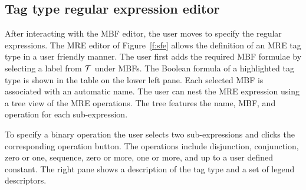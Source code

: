 \vspace{-1em}
\subsection{Tag type regular expression editor}

After interacting with the MBF editor, the user moves to 
specify the regular expressions. 
The MRE editor of Figure~\ref{f:sfe} allows the 
definition of an MRE tag type in a user friendly manner. 
The user first adds the required MBF formulae 
by selecting a label from ${\cal T}$ under MBFs. 
The Boolean formula of a highlighted tag type is shown in the table on the lower left pane. 
Each selected MBF is associated with an automatic name. 
The user can nest the MRE expression using a tree view of the MRE operations. 
The tree features the name, MBF, and operation for each sub-expression. 


To specify a binary operation the user selects two sub-expressions and clicks the corresponding
operation button. 
The operations include disjunction, conjunction, zero or one, sequence, zero or more, 
one or more, and up to a user defined constant.
The right pane shows a description of the tag type and a set of legend 
descriptors. 

%

